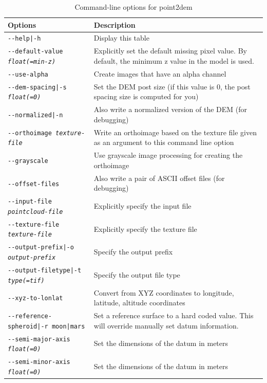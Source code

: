 \begin{longtable}{|l|p{10cm}|}
\caption{Command-line options for point2dem}
\label{tbl:point2dem}
\endfirsthead
\endhead
\endfoot
\endlastfoot
\hline
Options & Description \\ \hline \hline
\texttt{-\/-help|-h} & Display this table \\ \hline
\texttt{-\/-default-value \textit{float(=min-z)}} & Explicitly set the default missing pixel value. By default, the minimum z value in the model is used. \\ \hline
\texttt{-\/-use-alpha} & Create images that have an alpha channel \\ \hline
\texttt{-\/-dem-spacing|-s \textit{float(=0)}} & Set the \ac{DEM} post size (if this value is 0, the post spacing size is computed for you) \\ \hline
\texttt{-\/-normalized|-n} & Also write a normalized version of the \ac{DEM} (for debugging) \\ \hline
\texttt{-\/-orthoimage \textit{texture-file}} & Write an orthoimage based on the texture file given as an argument to this command line option \\ \hline
\texttt{-\/-grayscale} & Use grayscale image processing for creating the orthoimage \\ \hline
\texttt{-\/-offset-files} & Also write a pair of ASCII offset files (for debugging) \\ \hline
\texttt{-\/-input-file \textit{pointcloud-file}} & Explicitly specify the input file \\ \hline
\texttt{-\/-texture-file \textit{texture-file}} & Explicitly specify the texture file \\ \hline
\texttt{-\/-output-prefix|-o \textit{output-prefix}} & Specify the output prefix \\ \hline
\texttt{-\/-output-filetype|-t \textit{type(=tif)}} & Specify the output file type \\ \hline
\texttt{-\/-xyz-to-lonlat} & Convert from XYZ coordinates to longitude, latitude, altitude coordinates \\ \hline
\texttt{-\/-reference-spheroid|-r moon|mars} & Set a reference surface to a hard coded value. This will override manually set datum information. \\ \hline
\texttt{-\/-semi-major-axis \textit{float(=0)}} & Set the dimensions of the datum in meters\\ \hline
\texttt{-\/-semi-minor-axis \textit{float(=0)}} & Set the dimensions of the datum in meters\\ \hline

\end{longtable}
